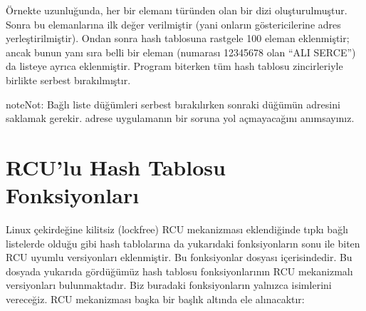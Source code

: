 \documentclass[a4paper,10pt,turkish]{sphinxmanual}
\begin{document}
\sphinxAtStartPar
Örnekte  uzunluğunda, her bir elemanı  türünden olan bir dizi
oluşturulmuştur. Sonra bu  elemanlarına ilk değer verilmiştir (yani onların
 göstericilerine  adres yerleştirilmiştir). Ondan sonra hash tablosuna
rastgele 100 eleman eklenmiştir; ancak bunun yanı sıra belli bir eleman (numarası 12345678
olan “ALI SERCE”) da listeye ayrıca eklenmiştir. Program biterken tüm hash tablosu
zincirleriyle birlikte serbest bırakılmıştır.

\begin{sphinxadmonition}{note}{Not:}
\sphinxAtStartPar
Bağlı liste düğümleri serbest bırakılırken sonraki düğümün adresini saklamak gerekir.
 adrese  uygulamanın bir soruna yol açmayacağını anımsayınız.
\end{sphinxadmonition}


\section{RCU’lu Hash Tablosu Fonksiyonları}
\label{\detokenize{kernellinkedlistandhashtable:rcu-lu-hash-tablosu-fonksiyonlari}}
\sphinxAtStartPar
Linux çekirdeğine kilitsiz (lock\sphinxhyphen{}free) RCU mekanizması eklendiğinde tıpkı bağlı listelerde
olduğu gibi hash tablolarına da yukarıdaki fonksiyonların sonu  ile biten RCU uyumlu
versiyonları eklenmiştir. Bu fonksiyonlar  dosyası içerisindedir.
Bu dosyada yukarıda gördüğümüz hash tablosu fonksiyonlarının RCU mekanizmalı versiyonları
bulunmaktadır. Biz buradaki fonksiyonların yalnızca isimlerini vereceğiz. RCU mekanizması
başka bir başlık altında ele alınacaktır:

\begin{sphinxVerbatim}[commandchars=\\\{\}]

\end{sphinxVerbatim}
\end{document}

